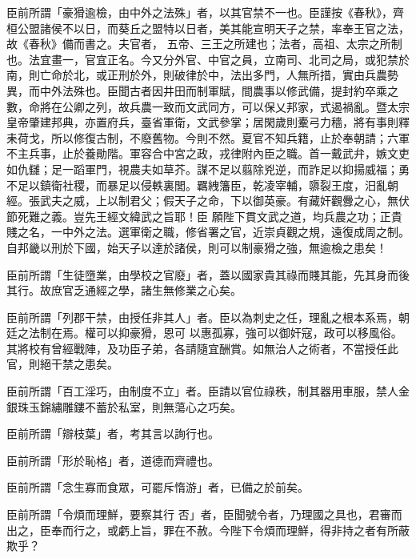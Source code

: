 \begin{pinyinscope}
 臣前所謂「豪猾逾檢，由中外之法殊」者，以其官禁不一也。臣謹按《春秋》，齊桓公盟諸侯不以日，而葵丘之盟特以日者，美其能宣明天子之禁，率奉王官之法，故《春秋》備而書之。夫官者，
 五帝、三王之所建也；法者，高祖、太宗之所制也。法宜畫一，官宜正名。今又分外官、中官之員，立南司、北司之局，或犯禁於南，則亡命於北，或正刑於外，則破律於中，法出多門，人無所措，實由兵農勢異，而中外法殊也。臣聞古者因井田而制軍賦，間農事以修武備，提封約卒乘之數，命將在公卿之列，故兵農一致而文武同方，可以保乂邦家，式遏禍亂。暨太宗皇帝肇建邦典，亦置府兵，臺省軍衛，文武參掌；居閑歲則櫜弓力穡，將有事則釋
 耒荷戈，所以修復古制，不廢舊物。今則不然。夏官不知兵籍，止於奉朝請；六軍不主兵事，止於養勛階。軍容合中宮之政，戎律附內臣之職。首一戴武弁，嫉文吏如仇讎；足一蹈軍門，視農夫如草芥。謀不足以翦除兇逆，而詐足以抑揚威福；勇不足以鎮衛社稷，而暴足以侵軼裏閭。羈絏籓臣，乾凌宰輔，隳裂王度，汨亂朝經。張武夫之威，上以制君父；假天子之命，下以御英豪。有藏奸觀釁之心，無伏節死難之義。豈先王經文緯武之旨耶！臣
 願陛下貫文武之道，均兵農之功；正貴賤之名，一中外之法。選軍衛之職，修省署之官，近崇貞觀之規，遠復成周之制。自邦畿以刑於下國，始天子以達於諸侯，則可以制豪猾之強，無逾檢之患矣！



 臣前所謂「生徒墮業，由學校之官廢」者，蓋以國家貴其祿而賤其能，先其身而後其行。故庶官乏通經之學，諸生無修業之心矣。



 臣前所謂「列郡干禁，由授任非其人」者。臣以為刺史之任，理亂之根本系焉，朝廷之法制在焉。權可以抑豪猾，恩可
 以惠孤寡，強可以御奸寇，政可以移風俗。其將校有曾經戰陣，及功臣子弟，各請隨宜酬賞。如無治人之術者，不當授任此官，則絕干禁之患矣。



 臣前所謂「百工淫巧，由制度不立」者。臣請以官位祿秩，制其器用車服，禁人金銀珠玉錦繡雕鏤不蓄於私室，則無蕩心之巧矣。



 臣前所謂「辯枝葉」者，考其言以詢行也。



 臣前所謂「形於恥格」者，道德而齊禮也。



 臣前所謂「念生寡而食眾，可罷斥惰游」者，已備之於前矣。



 臣前所謂「令煩而理鮮，要察其行
 否」者，臣聞號令者，乃理國之具也，君審而出之，臣奉而行之，或虧上旨，罪在不赦。今陛下令煩而理鮮，得非持之者有所蔽欺乎？




\end{pinyinscope}
